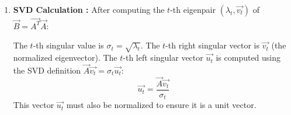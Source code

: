 \documentclass[journal,12pt,onecolumn]{IEEEtran}
\theoremstyle{remark}
\begin{document}
\begin{justify}
\begin{enumerate}
The deflated matrix $\vec{B_{t+1}}$ is computed from the previously used matrix $\vec{B_t}$ and the calculated eigenpair $(\lambda_t, \vec{v_t})$ as follows:
$$
\vec{B_{t+1}} = \vec{B_t} - \lambda_t \vec{v_t} \vec{v_t^T}
$$
where $\vec{B_1} = \vec{B}$. The Power Iteration is then applied to the deflated matrix $\vec{B_{t+1}}$ to find the next largest eigenpair, $(\lambda_{t+1}, \vec{v_{t+1}})$.
\item \textbf{SVD Calculation :}
After computing the $t$-th eigenpair $(\lambda_t, \vec{v_t})$ of $\vec{B}=\vec{A^T}\vec{ A}$:

     The $t$-th singular value is $\sigma_t = \sqrt{\lambda_t}$.
     The $t$-th right singular vector is $\vec{v_t}$ (the normalized eigenvector).
     The $t$-th left singular vector $\vec{u_t}$ is computed using the SVD definition $\vec{A} \vec{v_t} = \sigma_t \vec{u_t}$:
    $$
    \vec{u_t} = \frac{\vec{A} \vec{v_t}}{\sigma_t}
    $$
    This vector $\vec{u_t}$ must also be normalized to ensure it is a unit vector.
   \end{enumerate}
   \end{justify}
   \vspace{1em}
\end{document}
